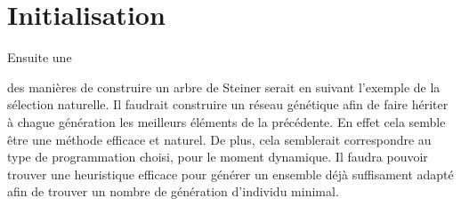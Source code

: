 \documentclass[paper=a4, fontsize=11pt]{scrartcl}	%
\numberwithin{equation}{section}															%
\numberwithin{figure}{section}																%
\numberwithin{table}{section}																%
\begin{document}
\section{Initialisation}
\begin{hspace}{1cm}
	Ensuite une 
\end{hspace}
des manières de construire un arbre de Steiner serait en suivant l'exemple de la sélection naturelle. Il faudrait construire un réseau génétique afin de faire hériter à chague génération les meilleurs éléments de la précédente. En effet cela semble être une méthode efficace et naturel. De plus, cela semblerait correspondre au type de programmation choisi, pour le moment dynamique.
\newline
Il faudra pouvoir trouver une heuristique efficace pour générer un ensemble déjà suffisament adapté afin de trouver un nombre de génération d'individu minimal.
\fi
\end{document}
